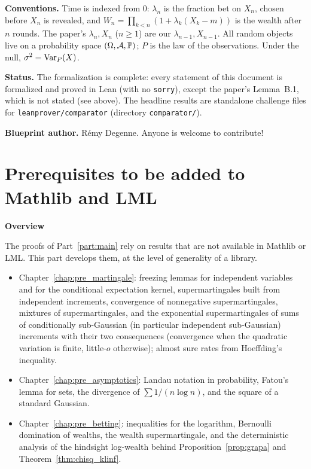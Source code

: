 \textbf{Conventions.} Time is indexed from $0$: $\lambda_n$ is the fraction bet on $X_n$, chosen
before $X_n$ is revealed, and $W_n = \prod_{k < n}(1 + \lambda_k (X_k - m))$ is the wealth after
$n$ rounds. The paper's $\lambda_n, X_n$ ($n \ge 1$) are our $\lambda_{n-1}, X_{n-1}$. All random
objects live on a probability space $(\Omega, \mathcal A, \mathbb{P})$; $P$ is the law of the
observations. Under the null, $\sigma^2 = \operatorname{Var}_P(X)$.

\textbf{Status.} The formalization is complete: every statement of this document is formalized
and proved in Lean (with no \texttt{sorry}), except the paper's Lemma~B.1, which is not stated
(see above). The headline results are standalone challenge files for
\texttt{leanprover/comparator} (directory \texttt{comparator/}).

\textbf{Blueprint author.} Rémy Degenne. Anyone is welcome to contribute!







\part{Prerequisites to be added to Mathlib and LML}
\label{part:prereq}

\textbf{Overview}

The proofs of Part~\ref{part:main} rely on results that are not available in Mathlib or LML.
This part develops them, at the level of generality of a library.
\begin{itemize}
  \item Chapter~\ref{chap:pre_martingale}: freezing lemmas for independent variables and for the
        conditional expectation kernel, supermartingales built from independent increments,
        convergence of nonnegative supermartingales, mixtures of supermartingales, and the
        exponential supermartingales of sums of conditionally sub-Gaussian (in particular
        independent sub-Gaussian) increments with their two consequences (convergence when the
        quadratic variation is finite, little-$o$ otherwise); almost sure rates from Hoeffding's
        inequality.
  \item Chapter~\ref{chap:pre_asymptotics}: Landau notation in probability, Fatou's lemma for
        sets, the divergence of $\sum 1/(n \log n)$, and the square of a
        standard Gaussian.
  \item Chapter~\ref{chap:pre_betting}: inequalities for the logarithm, Bernoulli domination of
        wealths, the wealth supermartingale, and the deterministic analysis of the hindsight
        log-wealth behind Proposition~\ref{prop:grapa} and Theorem~\ref{thm:chisq_klinf}.
\end{itemize}




